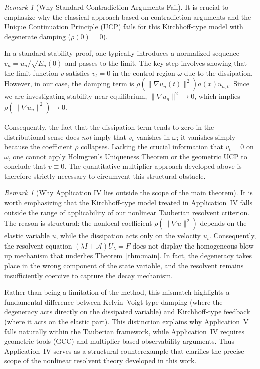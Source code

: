 \documentclass[11pt,reqno]{amsart}
\theoremstyle{remark}
\newtheorem{remark}[theorem]{Remark}
\begin{document}
\begin{remark}[Why Standard Contradiction Arguments Fail]
\label{rem:failure_UCP}
It is crucial to emphasize why the classical approach based on contradiction arguments and the Unique Continuation Principle (UCP) fails for this Kirchhoff-type model with degenerate damping ($\rho(0)=0$).

In a standard stability proof, one typically introduces a normalized sequence $v_n = u_n / \sqrt{E_n(0)}$ and passes to the limit. The key step involves showing that the limit function $v$ satisfies $v_t = 0$ in the control region $\omega$ due to the dissipation.
However, in our case, the damping term is $\rho(\|\nabla u_n(t)\|^2)a(x)u_{n,t}$. Since we are investigating stability near equilibrium, $\|\nabla u_n\|^2 \to 0$, which implies $\rho(\|\nabla u_n\|^2) \to 0$.

Consequently, the fact that the dissipation term tends to zero in the distributional sense does \textit{not} imply that $v_t$ vanishes in $\omega$; it vanishes simply because the coefficient $\rho$ collapses. Lacking the crucial information that $v_t = 0$ on $\omega$, one cannot apply Holmgren’s Uniqueness Theorem or the geometric UCP to conclude that $v \equiv 0$. The quantitative multiplier approach developed above is therefore strictly necessary to circumvent this structural obstacle.
\end{remark}





\begin{remark}[Why Application IV lies outside the scope of the main theorem]
\label{rem:outside_scope}
It is worth emphasizing that the Kirchhoff-type model treated in Application~IV falls
outside the range of applicability of our nonlinear Tauberian resolvent criterion.
The reason is structural: the nonlocal coefficient $\rho(\|\nabla u\|^2)$ depends on the
elastic variable $u$, while the dissipation acts only on the velocity $u_t$. Consequently,
the resolvent equation $(\lambda I+\mathcal A)U_\lambda=F$ does not display the homogeneous
blow-up mechanism that underlies Theorem~\ref{thm:main}. In fact, the degeneracy takes place
in the wrong component of the state variable, and the resolvent remains insufficiently
coercive to capture the decay mechanism.

Rather than being a limitation of the method, this mismatch highlights a fundamental
difference between Kelvin--Voigt type damping (where the degeneracy acts directly on the
dissipated variable) and Kirchhoff-type feedback (where it acts on the elastic part).
This distinction explains why Application~V falls naturally within the Tauberian framework,
while Application~IV requires geometric tools (GCC) and multiplier-based observability
arguments. Thus Application~IV serves as a structural counterexample that clarifies the
precise scope of the nonlinear resolvent theory developed in this work.
\end{remark}
\end{document}
